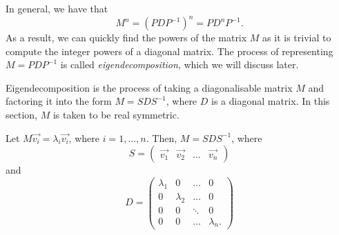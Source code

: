 \documentclass[a4paper, 12pt,oneside,openany]{book}
\begin{document}
In general, we have that $$M^n = (PDP^{-1})^n = PD^nP^{-1}.$$ As a result, we can quickly find the powers of the matrix $M$ as it is trivial to compute the integer powers of a diagonal matrix. The process of representing $M=PDP^{-1}$ is called \emph{eigendecomposition}, which we will discuss later.


Eigendecomposition is the process of taking a diagonalisable matrix $M$ and factoring it into the form $M=SDS^{-1}$, where $D$ is a diagonal matrix. In this section, $M$ is taken to be real symmetric.

Let $M\vec{v_i} = \lambda_i \vec{v_i}$, where $i= 1, \dots, n$. Then, $M=SDS^{-1}$, where $$S = \begin{pmatrix} \vec{v_1} & \vec{v_2} & \dots & \vec{v_n} \end{pmatrix}$$ and $$D = \begin{pmatrix} \lambda_1 & 0 & \dots & 0 \\ 0 & \lambda_2 & \dots & 0 \\ 0 & 0 & \ddots & 0 \\ 0 & 0 & \dots & \lambda_n. \end{pmatrix}$$
\end{document}
